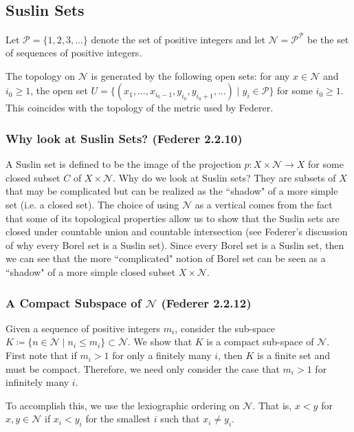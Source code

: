 \subsection{Suslin Sets}

Let \(\mathcal P = \{1, 2, 3, ...\}\) denote the set of positive integers and let
\(\mathcal N = {\mathcal P}^{\mathcal P}\) be the set of sequences of positive integers.

The topology on \(\mathcal N\) is generated by the following open sets: for any \(x \in \mathcal N\) and
\(i_0 \geq 1\), the open set
\(U = \{(x_1, ..., x_{i_0 - 1}, y_{i_0}, y_{i_0 + 1}, ...) \mid y_i \in \mathcal P\}\) for some \(i_0 \geq 1\).
This coincides with the topology of the metric used by Federer.

\subsubsection{Why look at Suslin Sets? (Federer 2.2.10)}

A Suslin set is defined to be the image of the projection \(p: X \times \mathcal N \to X\) for some closed subset \(C\) of \(X \times \mathcal N\). 
Why do we look at Suslin sets? They are subsets of \(X\) that may be complicated but can be realized as the ``shadow" of a more simple set (i.e. a closed set). 
The choice of using \(\mathcal N\) as a vertical comes from the fact that some of its topological properties allow us to show that the Suslin sets are closed
under countable union and countable intersection (see Federer's discussion of why every Borel set is a Suslin set). Since every Borel set is a Suslin set,
then we can see that the more ``complicated" notion of Borel set can be seen as a ``shadow" of a more simple closed subset \(X \times \mathcal N\).

\subsubsection{A Compact Subspace of \(\mathcal N\) (Federer 2.2.12)}

Given a sequence of positive integers \(m_i\), consider the sub-space
\(K \coloneqq \{n \in \mathcal N \mid n_i \leq m_i\} \subset \mathcal N\). We show that \(K\) is a compact
sub-space of \(\mathcal N\). First note that if \(m_i > 1\) for only a finitely many \(i\), then \(K\) is a finite
set and must be compact. Therefore, we need only consider the case that \(m_i > 1\) for infinitely many  \(i\).

To accomplish this, we use the lexiographic ordering on \(\mathcal N\). That is, \(x < y\) for
\(x, y \in \mathcal N\) if \(x_i < y_i\) for the smallest \(i\) such that \(x_i \neq y_i\).

